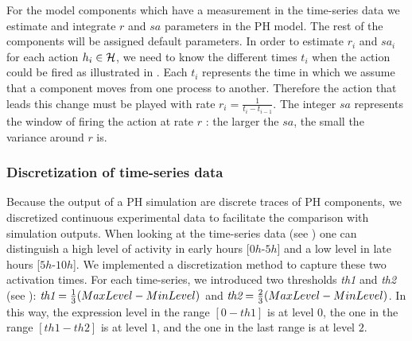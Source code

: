 For the model components which have a measurement in the time-series data we estimate and integrate $r$ and $sa$ parameters in the PH model. 
The rest of the components will be 
assigned default parameters. In order to estimate $r_{i}$ and $sa_{i}$ for each action $h_{i} \in \mathcal{H}$, we need to know the different times $t_{i}$  when the action could be fired as illustrated 
in . Each  $t_{i}$ represents the time in which we assume that a component moves from one process to another. Therefore the action that leads this 
change must be played with rate $r_{i}=\frac{1}{t_{i}-t_{i-1}}$. The integer $sa$ represents the window of firing the action at rate $r$ : the larger the $sa$, the small the variance around $r$ is. 

\subsubsection{Discretization of time-series data}

Because the output of a PH simulation are discrete traces of PH components, we discretized continuous experimental data to facilitate 
the comparison with simulation outputs.
When looking at the time-series data (see ) one can distinguish a high level of
activity in early hours [$0h$-$5h$] and a low level in late hours [$5h$-$10h$]. 
We implemented a discretization method to capture these
two activation times. For each time-series, we introduced two thresholds \emph{th1} and \emph{th2} (see ): 
$\emph{th1}=\frac{1}{3}(MaxLevel-MinLevel)$ and $\emph{th2}=\frac{2}{3}(MaxLevel-MinLevel)$. 
In this way, the expression level in the range $[0-th1]$ is at level $0$, the one in the range $[th1-th2]$ is at level $1$, and the one in the last range is at
level $2$. 


